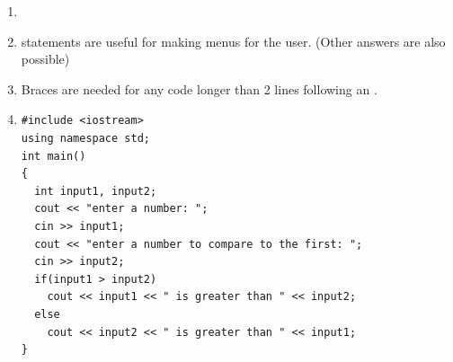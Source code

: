 
\begin{enumerate}
\item {}
\item {} statements are useful for making menus for the user. (Other answers are also possible)
\item Braces are needed for any code longer than 2 lines following an .
\item \noindent\begin{minipage}{\linewidth}\begin{lstlisting}
#include <iostream>
using namespace std;
int main()
{
  int input1, input2;
  cout << "enter a number: ";
  cin >> input1;
  cout << "enter a number to compare to the first: ";
  cin >> input2;
  if(input1 > input2)
    cout << input1 << " is greater than " << input2;
  else
    cout << input2 << " is greater than " << input1;
}
\end{lstlisting}\end{minipage}

\end{enumerate}

%

